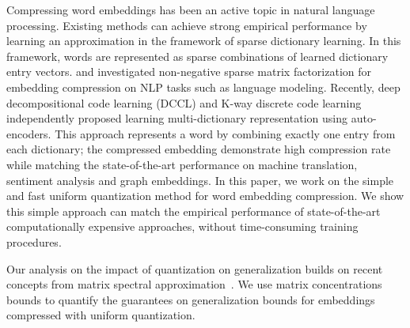 Compressing word embeddings has been an active topic in natural language processing. Existing methods can achieve strong empirical performance by learning an approximation in the framework of sparse dictionary learning. In this framework, words are represented as sparse combinations of learned dictionary entry vectors. \cite{murphy2012learning} and \cite{sparse16} investigated non-negative sparse matrix factorization for embedding compression on NLP tasks such as language modeling. Recently, deep decompositional code learning \cite{dccl17} (DCCL) and K-way discrete code learning \cite{chen2018learning} independently proposed learning multi-dictionary representation using auto-encoders. This approach represents a word by combining exactly one entry from each dictionary; the compressed embedding demonstrate high compression rate while matching the state-of-the-art performance on machine translation, sentiment analysis and graph embeddings. In this paper, we work on the simple and fast uniform quantization method for word embedding compression. We show this simple approach can match the empirical performance of state-of-the-art computationally expensive approaches, without time-consuming training procedures.

Our analysis on the impact of quantization on generalization builds on recent concepts from matrix spectral approximation~\citep{avron17, lprff18}. We use matrix concentrations bounds to quantify the guarantees on generalization bounds for embeddings compressed with uniform quantization.



